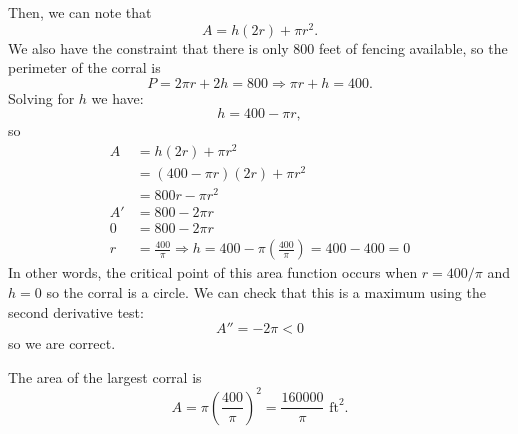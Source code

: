 \documentclass{ximera}
\begin{document}
\begin{exercise}
\begin{hint}
Then, we can note that \[A = h(2r)+\pi r^2.\] We also have the
constraint that there is only 800 feet of fencing available, so the
perimeter of the corral is
\[P = 2\pi r + 2h = 800 \Rightarrow \pi r +h = 400.\] Solving for $h$ we
have: \[h = 400-\pi r,\] so \begin{align*}
A &=  h(2r)+\pi r^2 \\
&= (400-\pi r)(2r) + \pi r^2 \\
&= 800r - \pi r^2 \\
A' &= 800 - 2\pi r \\
0 &= 800-2\pi r \\
r &= \frac{400}{\pi} \Rightarrow h = 400-\pi\left(\frac{400}{\pi}\right) = 400-400=0
\end{align*} In other words, the critical point of this area function occurs when
$r=400/\pi$ and $h=0$ so the corral is a circle. We can check that this
is a maximum using the second derivative test: \[A'' = -2\pi < 0 \] so
we are correct.

The area of the largest corral is
\[A = \pi \left(\frac{400}{\pi}\right)^2 = \frac{160000}{\pi} \mbox{ ft}^2.\]
\end{hint}


\begin{multipleChoice}
\end{multipleChoice}

\end{exercise}
\end{document}
